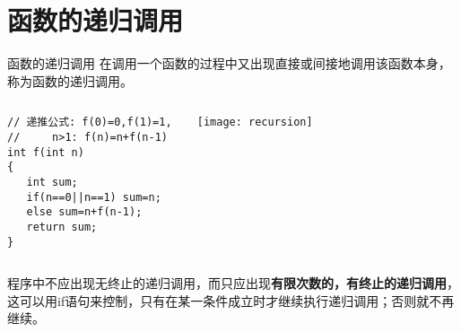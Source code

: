 \section{函数的递归调用}

\begin{frame}{函数的递归调用}
在调用一个函数的过程中又出现直接或间接地调用该函数本身，称为函数的递归调用。
\begin{columns}[T]
\begin{lstlisting}
// 递推公式: f(0)=0,f(1)=1, 
//     n>1: f(n)=n+f(n-1)
int f(int n) 
{
   int sum;
   if(n==0||n==1) sum=n;
   else sum=n+f(n-1); 
   return sum; 
}
\end{lstlisting}
\texttt{[image: recursion]}
\end{columns}
程序中不应出现无终止的递归调用，而只应出现\textbf{有限次数的，有终止的递归调用}，这可以用if语句来控制，只有在某一条件成立时才继续执行递归调用；否则就不再继续。
\end{frame}

